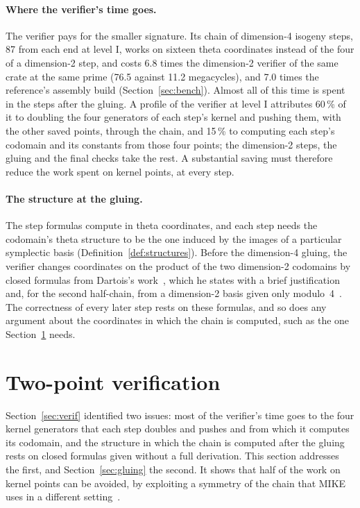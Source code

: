 \documentclass[version=preprint]{iacrcc}
\begin{document}
    \paragraph{Where the verifier's time goes.}
    The verifier pays for the smaller signature. Its chain of dimension-4
    isogeny steps, 87 from each end at level I, works on sixteen theta
    coordinates instead of the four of a dimension-2 step, and costs 6.8 times
    the dimension-2 verifier of the same crate at the same prime (76.5 against
    11.2 megacycles), and 7.0 times the reference's assembly build
    (Section~\ref{sec:bench}). Almost all of this time is spent in the steps
    after the gluing. A profile of the verifier at level I attributes 60\,\%
    of it to doubling the four generators of each step's kernel and pushing
    them, with the other saved points, through the chain, and 15\,\% to
    computing each step's codomain and its constants from those four points;
    the dimension-2 steps, the gluing and the final checks take the rest. A
    substantial saving must therefore reduce the work spent on kernel points,
    at every step.

    \paragraph{The structure at the gluing.}
    The step formulas compute in theta coordinates, and each step needs the
    codomain's theta structure to be the one induced by the images of a
    particular symplectic basis (Definition~\ref{def:structures}). Before the
    dimension-4 gluing, the verifier changes coordinates on the product of the
    two dimension-2 codomains by closed formulas from Dartois's
    work~\cite[Lemmas 30 and 31]{Dar24}, which he states with a brief
    justification and, for the second half-chain, from a dimension-2 basis
    given only modulo~4~\cite[Appendix C.1]{Dar24}. The correctness of every
    later step rests on these formulas, and so does any argument about the
    coordinates in which the chain is computed, such as the one
    Section~\ref{sec:twopoint} needs.


    \section{Two-point verification}
    \label{sec:twopoint}

    Section~\ref{sec:verif} identified two issues: most of the verifier's time
    goes to the four kernel generators that each step doubles and pushes and
    from which it computes its codomain, and the structure in which the chain
    is computed after the gluing rests on closed formulas given without a full
    derivation. This
    section addresses the first, and Section~\ref{sec:gluing} the second. It
    shows that half of the work on
    kernel points can be avoided, by exploiting a symmetry of the chain that
    MIKE uses in a different setting~\cite[Appendix E.2]{BDD+26}.
\end{document}
